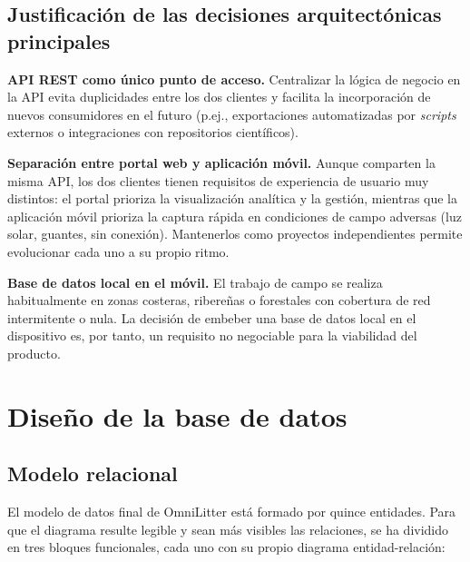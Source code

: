 \subsection{Justificación de las decisiones arquitectónicas principales}

\textbf{API REST como único punto de acceso.}
Centralizar la lógica de negocio en la API evita duplicidades entre los dos clientes y
facilita la incorporación de nuevos consumidores en el futuro (p.ej., exportaciones
automatizadas por \textit{scripts} externos o integraciones con repositorios científicos).

\textbf{Separación entre portal web y aplicación móvil.}
Aunque comparten la misma API, los dos clientes tienen requisitos de experiencia de usuario
muy distintos: el portal prioriza la visualización analítica y la gestión, mientras que la
aplicación móvil prioriza la captura rápida en condiciones de campo adversas (luz solar, guantes,
sin conexión). Mantenerlos como proyectos independientes permite evolucionar cada uno a su
propio ritmo.

\textbf{Base de datos local en el móvil.}
El trabajo de campo se realiza habitualmente en zonas costeras, ribereñas o forestales
con cobertura de red intermitente o nula. La decisión de embeber una base de datos local en
el dispositivo es, por tanto, un requisito no negociable para la viabilidad del producto.

\section{Diseño de la base de datos}

\subsection{Modelo relacional}

El modelo de datos final de OmniLitter está formado por quince entidades. Para que
el diagrama resulte legible y sean más visibles las relaciones, se ha
dividido en tres bloques funcionales, cada uno con su propio diagrama
entidad-relación:

